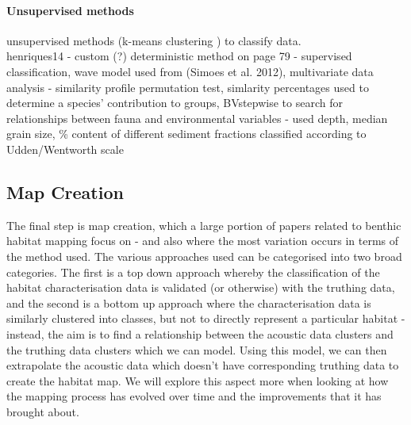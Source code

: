 \documentclass[12pt]{article}
\begin{document}
\begin{multicols}{2}
            \paragraph{Unsupervised methods}
            unsupervised methods (k-means clustering \cite{henriques14}) to classify data.\\
            henriques14 - custom (?) deterministic method on page 79 - supervised classification, wave model used from (Simoes et al. 2012), multivariate data analysis - similarity profile permutation test, simlarity percentages used to determine a species' contribution to groups, BVstepwise to search for relationships between fauna and environmental variables - used depth, median grain size, \% content of different sediment fractions classified according to Udden/Wentworth scale\cite{henriques14}

            \subsection{Map Creation}
            The final step is map creation, which a large portion of papers related to benthic habitat mapping focus on - and also where the most variation occurs in terms of the method used. The various approaches used can be categorised into two broad categories. The first is a top down approach whereby the classification of the habitat characterisation data is validated (or otherwise) with the truthing data, and the second is a bottom up approach where the characterisation data is similarly clustered into classes, but not to directly represent a particular habitat - instead, the aim is to find a relationship between the acoustic data clusters and the truthing data clusters which we can model. Using this model, we can then extrapolate the acoustic data which doesn't have corresponding truthing data to create the habitat map.\cite{ahsan11} We will explore this aspect more when looking at how the mapping process has evolved over time and the improvements that it has brought about. \\


\end{multicols}
\end{document}
